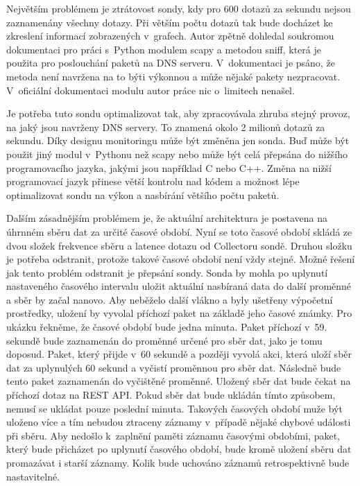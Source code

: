 \documentclass[thesis=M,czech]{src/FITthesis}[2019/12/23]
\begin{document}
Největším problémem je ztrátovost sondy, kdy pro 600 dotazů za sekundu nejsou zaznamenány všechny dotazy. Při větším počtu dotazů tak bude \linebreak docházet ke zkreslení informací zobrazených v~grafech. Autor zpětně dohledal soukromou dokumentaci pro práci s~Python modulem scapy a metodou sniff, která je použita pro poslouchání paketů na DNS serveru. V~dokumentaci je psáno, že metoda není navržena na to býti výkonnou a může nějaké pakety nezpracovat. V~oficiální dokumentaci modulu autor práce nic o~limitech nenašel. \cite{scapy-unofficial}

Je potřeba tuto sondu optimalizovat tak, aby zpracovávala zhruba stejný provoz, na jaký jsou navrženy DNS servery. To znamená okolo 2 milionů dotazů za sekundu. Díky designu monitoringu může být změněna jen sonda. Buď může být použit jiný modul v~Pythonu než scapy nebo může být celá přepsána do nižšího programovacího jazyka, jakými jsou například C nebo C++. Změna na nižší programovací jazyk přinese větší kontrolu nad kódem a možnost lépe optimalizovat sondu na výkon a nasbírání většího počtu paketů.

Dalším zásadnějším problémem je, že aktuální architektura je postavena na úhrnném sběru dat za určité časové období. Nyní se toto časové období skládá ze dvou složek frekvence sběru  a latence dotazu od Collectoru sondě. Druhou složku je potřeba odstranit, protože takové časové období není  vždy stejné. Možné řešení jak tento problém odstranit je přepsání sondy. Sonda by mohla po uplynutí nastaveného časového intervalu uložit aktuální nasbíraná data do další proměnné a sběr by začal nanovo. Aby neběželo další vlákno a byly ušetřeny výpočetní prostředky, uložení by vyvolal příchozí paket na základě jeho časové známky.  Pro ukázku řekněme, že časové období bude jedna minuta. Paket příchozí v~59. sekundě bude zaznamenán do proměnné určené pro sběr dat, jako je tomu doposud. Paket, který přijde v~60 sekundě a později vyvolá akci, která uloží sběr dat za uplynulých 60 sekund a vyčistí proměnnou pro sběr dat. Následně bude tento paket zaznamenán do vyčištěné proměnné. Uložený sběr dat bude čekat na příchozí dotaz na REST API. Pokud sběr dat bude ukládán tímto způsobem, nemusí se ukládat pouze poslední minuta. Takových časových období muže být uloženo více a tím nebudou ztraceny záznamy v~případě nějaké chybové události při sběru. Aby nedošlo k~zaplnění paměti záznamu časovými obdobími, paket, který bude přicházet po uplynutí časového období, bude kromě uložení sběru dat promazávat i starší záznamy. Kolik bude uchováno záznamů retrospektivně bude nastavitelné. 
\end{document}
